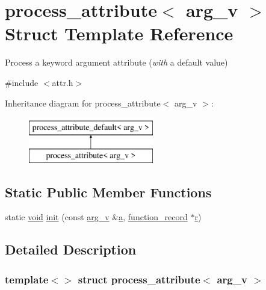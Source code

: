 \hypertarget{structprocess__attribute_3_01arg__v_01_4}{}\section{process\+\_\+attribute$<$ arg\+\_\+v $>$ Struct Template Reference}
\label{structprocess__attribute_3_01arg__v_01_4}


Process a keyword argument attribute ({\itshape with} a default value)  




{\ttfamily \#include $<$attr.\+h$>$}

Inheritance diagram for process\+\_\+attribute$<$ arg\+\_\+v $>$\+:\begin{figure}[H]
\begin{center}
\leavevmode
\includegraphics[height=2.000000cm]{structprocess__attribute_3_01arg__v_01_4}
\end{center}
\end{figure}
\subsection*{Static Public Member Functions}
\begin{DoxyCompactItemize}
\item 
static \mbox{\hyperlink{_s_d_l__opengles2__gl2ext_8h_ae5d8fa23ad07c48bb609509eae494c95}{void}} \mbox{\hyperlink{structprocess__attribute_3_01arg__v_01_4_a80cd5f1ca1ee8c3e28ed0a1836bdaab6}{init}} (const \mbox{\hyperlink{structarg__v}{arg\+\_\+v}} \&\mbox{\hyperlink{_s_d_l__opengl__glext_8h_a3309789fc188587d666cda5ece79cf82}{a}}, \mbox{\hyperlink{structfunction__record}{function\+\_\+record}} $\ast$\mbox{\hyperlink{_s_d_l__opengl_8h_a42ce7cdc612e53abee15043f80220d97}{r}})
\end{DoxyCompactItemize}


\subsection{Detailed Description}
\subsubsection*{template$<$$>$\newline
struct process\+\_\+attribute$<$ arg\+\_\+v $>$}

